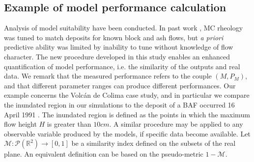 \documentclass{article}
\begin{document}
\subsection{Example of model performance calculation}
Analysis of model suitability have been conducted. In past work \citep{Patra2005}, MC rheology was tuned to match deposits for known block and ash flows, but {\it a priori} predictive ability was limited by inability to tune without knowledge of flow character. The new procedure developed in this study enables an enhanced quantification of model performance, i.e. the similarity of the outputs and real data. We remark that the measured performance refers to the couple $\left(M, P_M\right)$, and that different parameter ranges can produce different performances. Our example concerns the Volc{\'a}n de Colima case study, and in particular we compare the inundated region in our simulations to the deposit of a BAF occurred 16 April 1991 \citep{Saucedo2004, Rupp2004, Rupp2006}. The inundated region is defined as the points in which the maximum flow height $H$ is greater than $10 cm$. A similar procedure may be applied to any observable variable produced by the models, if specific data become available. Let $\mathcal M:\mathcal P(\mathbb R^2)\rightarrow[0,1]$ be a similarity index defined on the subsets of the real plane. An equivalent definition can be based on the pseudo-metric $1-\mathcal M$.
\end{document}
